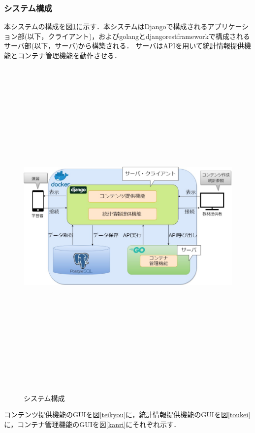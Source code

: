 \subsubsection{システム構成}
本システムの構成を図\ref{system}に示す．本システムはDjangoで構成されるアプリケーション部(以下，クライアント)，およびgolangとdjangorestframeworkで構成されるサーバ部(以下，サーバ)から構築される．
サーバはAPIを用いて統計情報提供機能とコンテナ管理機能を動作させる．

\begin{figure}[htbp]
    \begin{center}
        \includegraphics[width=18cm,height=17cm,keepaspectratio]{system-crop.pdf}\\
    \end{center}
    \caption{システム構成}
    \label{system}
\end{figure}


コンテンツ提供機能のGUIを図\ref{teikyou}に，統計情報提供機能のGUIを図\ref{toukei}に，コンテナ管理機能のGUIを図\ref{kanri}にそれぞれ示す．

